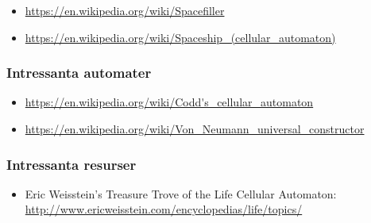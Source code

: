 \begin{itemize}[noitemsep,topsep=0pt]
    \item \url{https://en.wikipedia.org/wiki/Spacefiller}
    \item \url{https://en.wikipedia.org/wiki/Spaceship_(cellular_automaton)}
\end{itemize}

\subsubsection{Intressanta automater}

\begin{itemize}[noitemsep,topsep=0pt]
	\item \url{https://en.wikipedia.org/wiki/Codd's_cellular_automaton}
	\item \url{https://en.wikipedia.org/wiki/Von_Neumann_universal_constructor}
\end{itemize}

\subsubsection{Intressanta resurser}

\begin{itemize}[noitemsep,topsep=0pt]
    \item Eric Weisstein's Treasure Trove of the Life Cellular Automaton: \url{http://www.ericweisstein.com/encyclopedias/life/topics/}
\end{itemize}










